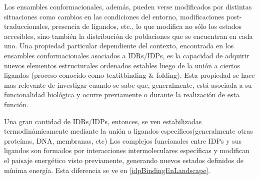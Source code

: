 Los ensambles conformacionales, además, pueden verse modificados por distintas situaciones como cambios en las condiciones del entorno, modificaciones post-traduccionales, presencia de ligandos, etc.,
lo que modifica no sólo los estados accesibles, sino también la distribución de poblaciones que se encuentran en cada uno.
Una propiedad particular dependiente del contexto, encontrada en los ensambles conformacionales asociados a IDRs/IDPs, es la capacidad de adquirir nuevos elementos estructurales ordenados estables luego de la unión a ciertos ligandos
(proceso conocido como textit{binding \& folding}\cite{dyson2005intrinsically}). 
Esta propiedad se hace mas relevante de investigar cuando se sabe que, generalmente, está asociada a su funcionalidad biológica y ocurre previamente o durante la realización de esta función.

Una gran cantidad de IDRs/IDPs, entonces, se ven estabilizadas termodinámicamente mediante la unión a ligandos específicos(generalmente otras proteínas, DNA, membranas, etc)
Los complejos funcionales entre IDPs y sus ligandos son formados por interacciones intermoleculares específicas y modifican el paisaje energético visto previamente, generando nuevos estados definidos de mínima energía.
Esta diferencia se ve en \ref{idpBindingEnLandscape}.


